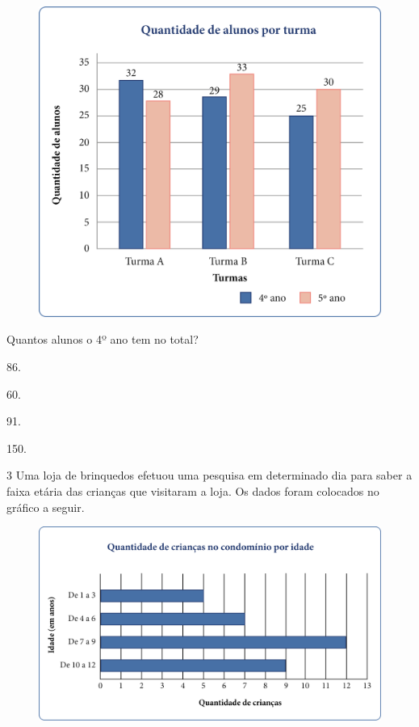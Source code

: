 \begin{figure}[htpb!]
\centering
\includegraphics[width=.6\textwidth]{media/image50.png}
\end{figure}

Quantos alunos o 4º ano tem no total?

\begin{multicols}{2}
\begin{escolha}
\item
  86.
\item
  60.
\item
  91.
\item
  150.
\end{escolha}
\end{multicols}

\num{3} Uma loja de brinquedos efetuou uma pesquisa em determinado dia para
saber a faixa etária das crianças que visitaram a loja. Os dados foram
colocados no gráfico a seguir.

\begin{figure}[htpb!]
\centering
\includegraphics[width=\textwidth]{media/image51.png}
\end{figure}

